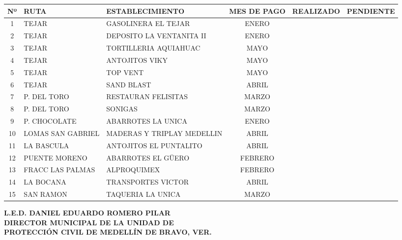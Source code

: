 \documentclass[11pt,letterpaper]{article}
\begin{document}
\noindent
\begin{tabularx}{\textwidth}{| c | >{\raggedright\arraybackslash}p{3.0cm} | X | c | p{2.2cm} | p{2.2cm} |}
\hline
\textbf{Nº} & \textbf{RUTA} & \textbf{ESTABLECIMIENTO} & \textbf{MES DE PAGO} & \textbf{REALIZADO} & \textbf{PENDIENTE} \\ \hline
  1 & TEJAR & GASOLINERA EL TEJAR & ENERO &  &  \\ \hline
  2 & TEJAR & DEPOSITO LA VENTANITA II & ENERO &  &  \\ \hline
  3 & TEJAR & TORTILLERIA AQUIAHUAC & MAYO &  &  \\ \hline
  4 & TEJAR & ANTOJITOS VIKY & MAYO &  &  \\ \hline
  5 & TEJAR & TOP VENT & MAYO &  &  \\ \hline
  6 & TEJAR & SAND BLAST & ABRIL &  &  \\ \hline
  7 & P. DEL TORO & RESTAURAN FELISITAS & MARZO &  &  \\ \hline
  8 & P. DEL TORO & SONIGAS & MARZO &  &  \\ \hline
  9 & P. CHOCOLATE & ABARROTES LA UNICA & ENERO &  &  \\ \hline
  10 & LOMAS SAN GABRIEL & MADERAS Y TRIPLAY MEDELLIN & ABRIL &  &  \\ \hline
  11 & LA BASCULA & ANTOJITOS EL PUNTALITO & ABRIL &  &  \\ \hline
  12 & PUENTE MORENO & ABARROTES EL GÜERO & FEBRERO &  &  \\ \hline
  13 & FRACC LAS PALMAS & ALPROQUIMEX & FEBRERO &  &  \\ \hline
  14 & LA BOCANA & TRANSPORTES VICTOR & ABRIL &  &  \\ \hline
  15 & SAN RAMON & TAQUERIA LA UNICA & MARZO &  &  \\ \hline
\end{tabularx}

\vfill

\begin{center}
    \textbf{L.E.D. DANIEL EDUARDO ROMERO PILAR}\\[0.2em]
    \textbf{DIRECTOR MUNICIPAL DE LA UNIDAD DE}\\[0.2em]
    \textbf{PROTECCIÓN CIVIL DE MEDELLÍN DE BRAVO, VER.}
\end{center}
\end{document}

